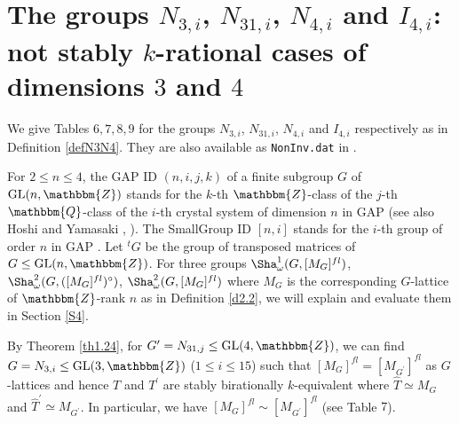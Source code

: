 \documentclass{amsart}
\theoremstyle{plain}
\newtheorem{lemma}[theorem]{Lemma}
\theoremstyle{definition}
\theoremstyle{remark}
\newcommand{\bZ}{\mathbbm{Z}}\newcommand{\bQ}{\mathbbm{Q}}
\newcommand{\GL}{{\rm GL}}\newcommand{\SL}{{\rm SL}}
\newcounter{sub}\def\tr{\mbox{tr }}
\begin{document}

\section{The groups $N_{3,i}$, $N_{31,i}$, $N_{4,i}$ and $I_{4,i}$: not stably $k$-rational cases of dimensions $3$ and $4$}\label{S2}

We give Tables $6, 7, 8, 9$ for the groups 
$N_{3,i}$, $N_{31,i}$, $N_{4,i}$ and $I_{4,i}$ respectively 
as in Definition \ref{defN3N4}. 
They are also available as 
{\tt NonInv.dat} in \cite{BCAlgTori}. 

For $2\leq n\leq 4$, the GAP ID $(n,i,j,k)$ of a finite subgroup 
$G$ of $\GL(n,\bZ)$ stands for 
the $k$-th $\bZ$-class of the $j$-th $\bQ$-class of 
the $i$-th crystal system of dimension $n$ in GAP 
(see also Hoshi and Yamasaki \cite[Chapter 3]{HY17}, 
\cite[Table 1]{BBNWZ78}). 
%
The SmallGroup ID $[n,i]$ stands for 
the $i$-th group of order $n$ in GAP \cite{GAP}. 
Let ${}^tG$ be the group of transposed matrices of $G\leq \GL(n,\bZ)$. 
For three groups 
$\Sha^1_\omega(G,[M_G]^{fl})$, 
$\Sha^2_\omega(G,([M_G]^{fl})^\circ)$, 
$\Sha^2_\omega(G,[M_G]^{fl})$ 
where $M_G$ is the corresponding $G$-lattice of $\bZ$-rank $n$ 
as in Definition \ref{d2.2}, 
we will explain and evaluate them in Section \ref{S4}. 


%
%
%

By Theorem \ref{th1.24},  
for $G^\prime=N_{31,j}\leq \GL(4,\bZ)$, 
we can find $G=N_{3,i}\leq \GL(3,\bZ)$ ($1\leq i\leq 15$) 
such that $[M_G]^{fl}=[M_{G^\prime}]^{fl}$ as $G$-lattices 
and hence $T$ and $T^\prime$ are stably birationally $k$-equivalent
where $\widehat{T}\simeq M_G$ and 
$\widehat{T}^\prime\simeq M_{G^\prime}$. 
In particular, we have  
$[M_G]^{fl} \sim [M_{G^\prime}]^{fl}$ (see Table $7$).\\
\end{document}
